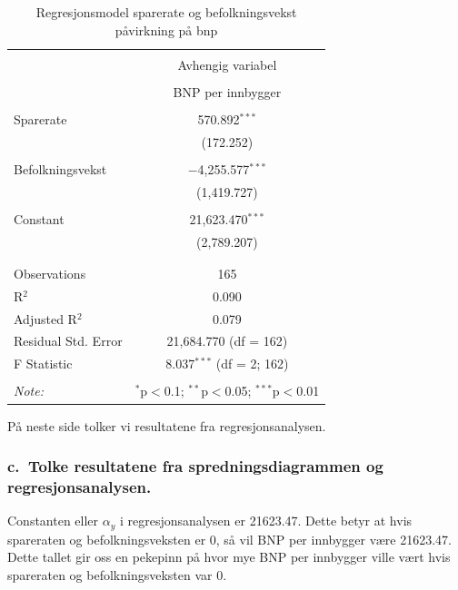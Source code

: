 \documentclass[
  12pt,
  a4paper,
  DIV=11,
  numbers=noendperiod]{scrartcl}
\begin{document}
\begin{table}[!htbp] \centering 
  \caption{Regresjonsmodel sparerate og befolkningsvekst påvirkning på bnp} 
  \label{tab:table1} 
\begin{tabular}{@{\extracolsep{5pt}}lc} 
\\[-1.8ex]\hline 
\hline \\[-1.8ex] 
 & \multicolumn{1}{c}{Avhengig variabel} \\ 
\cline{2-2} 
\\[-1.8ex] & BNP per innbygger \\ 
\hline \\[-1.8ex] 
 Sparerate & 570.892$^{***}$ \\ 
  & (172.252) \\ 
  & \\ 
 Befolkningsvekst & $-$4,255.577$^{***}$ \\ 
  & (1,419.727) \\ 
  & \\ 
 Constant & 21,623.470$^{***}$ \\ 
  & (2,789.207) \\ 
  & \\ 
\hline \\[-1.8ex] 
Observations & 165 \\ 
R$^{2}$ & 0.090 \\ 
Adjusted R$^{2}$ & 0.079 \\ 
Residual Std. Error & 21,684.770 (df = 162) \\ 
F Statistic & 8.037$^{***}$ (df = 2; 162) \\ 
\hline 
\hline \\[-1.8ex] 
\textit{Note:}  & \multicolumn{1}{r}{$^{*}$p$<$0.1; $^{**}$p$<$0.05; $^{***}$p$<$0.01} \\ 
\end{tabular} 
\end{table}

På neste side tolker vi resultatene fra regresjonsanalysen.

\clearpage

\subsubsection{c.~Tolke resultatene fra spredningsdiagrammen og
regresjonsanalysen.}\label{c.-tolke-resultatene-fra-spredningsdiagrammen-og-regresjonsanalysen.}

Constanten eller \(\alpha_y\) i regresjonsanalysen er 21623.47. Dette
betyr at hvis spareraten og befolkningsveksten er 0, så vil BNP per
innbygger være 21623.47. Dette tallet gir oss en pekepinn på hvor mye
BNP per innbygger ville vært hvis spareraten og befolkningsveksten var
0.
\end{document}
